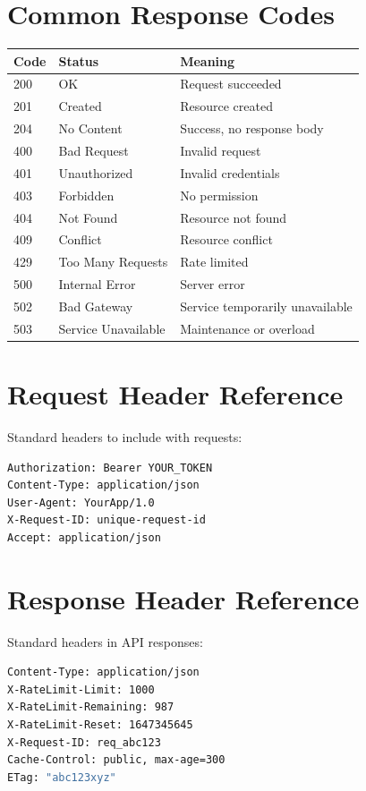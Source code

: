 \documentclass{report}
\begin{document}
\section{Common Response Codes}

\begin{center}
\begin{tabular}{llp{4cm}}
\toprule
\textbf{Code} & \textbf{Status} & \textbf{Meaning} \\
\midrule
200 & OK & Request succeeded \\
201 & Created & Resource created \\
204 & No Content & Success, no response body \\
400 & Bad Request & Invalid request \\
401 & Unauthorized & Invalid credentials \\
403 & Forbidden & No permission \\
404 & Not Found & Resource not found \\
409 & Conflict & Resource conflict \\
429 & Too Many Requests & Rate limited \\
500 & Internal Error & Server error \\
502 & Bad Gateway & Service temporarily unavailable \\
503 & Service Unavailable & Maintenance or overload \\
\bottomrule
\end{tabular}
\end{center}

\section{Request Header Reference}

Standard headers to include with requests:

\begin{lstlisting}[language=bash]
Authorization: Bearer YOUR_TOKEN
Content-Type: application/json
User-Agent: YourApp/1.0
X-Request-ID: unique-request-id
Accept: application/json
\end{lstlisting}

\section{Response Header Reference}

Standard headers in API responses:

\begin{lstlisting}[language=bash]
Content-Type: application/json
X-RateLimit-Limit: 1000
X-RateLimit-Remaining: 987
X-RateLimit-Reset: 1647345645
X-Request-ID: req_abc123
Cache-Control: public, max-age=300
ETag: "abc123xyz"
\end{lstlisting}
\end{document}
